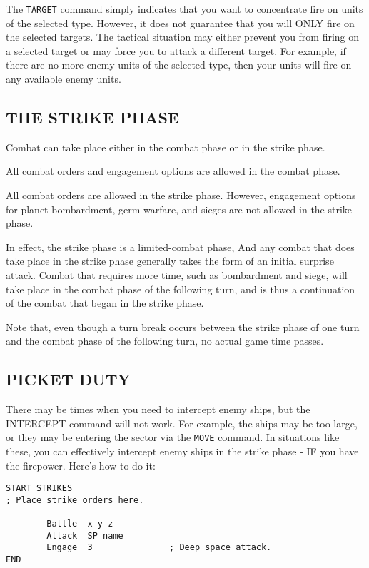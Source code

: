 \documentclass[10pt,titlepage]{article}
\begin{document}
The \texttt{TARGET} command simply indicates that you want to concentrate fire on units
of the selected type.  However, it does not guarantee that you will ONLY fire
on the selected targets.  The tactical situation may either prevent you from
firing on a selected target or may force you to attack a different target.  For
example, if there are no more enemy units of the selected type, then your units
will fire on any available enemy units.


\subsection{THE STRIKE PHASE}
\label{sec:strikephase}


Combat can take place either in the combat phase or in the strike phase.

All combat orders and engagement options are allowed in the combat phase.

All combat orders are allowed in the strike phase.  However, engagement options
for planet bombardment, germ warfare, and sieges are not allowed in the strike
phase.

In effect, the strike phase is a limited-combat phase, And any combat that does
take place in the strike phase generally takes the form of an initial surprise
attack.  Combat that requires more time, such as bombardment and siege,
will take place in the combat phase of the following turn, and is thus
a continuation of the combat that began in the strike phase.

Note that, even though a turn break occurs between the strike phase of one turn
and the combat phase of the following turn, no actual game time passes.


\subsection{PICKET DUTY}
\label{sec:picketduty}


There may be times when you need to intercept enemy ships, but the INTERCEPT
command will not work.  For example, the ships may be too large, or they may be
entering the sector via the \texttt{MOVE} command.  In situations like these, you can
effectively intercept enemy ships in the strike phase - IF you have the
firepower.  Here's how to do it:

\begin{verbatim}
START STRIKES
; Place strike orders here.

        Battle  x y z
        Attack  SP name
        Engage  3               ; Deep space attack.
END\end{verbatim} 
\end{document}
